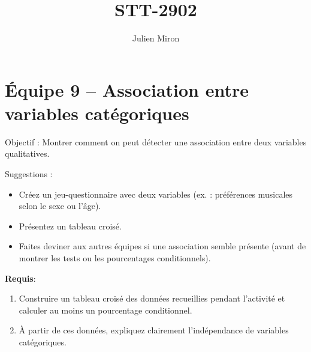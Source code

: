 \documentclass{article}
\title{STT-2902}
\author{Julien Miron}
\begin{document}
\section*{Équipe 9 – Association entre variables catégoriques}

Objectif : Montrer comment on peut détecter une association entre deux variables qualitatives.


\vspace{1cm}
Suggestions :
\begin{itemize}
    \item Créez un jeu-questionnaire avec deux variables (ex. : préférences musicales selon le sexe ou l’âge).
    \item Présentez un tableau croisé.
    \item Faites deviner aux autres équipes si une association semble présente (avant de montrer les tests ou les pourcentages conditionnels).


\end{itemize}

\vspace{1cm}
\textbf{Requis}:

\begin{enumerate}
    \item Construire un tableau croisé des données recueillies pendant l’activité et calculer au moins un pourcentage conditionnel.
    \item À partir de ces données, expliquez clairement l'indépendance de variables catégoriques.
\end{enumerate}
\end{document}
